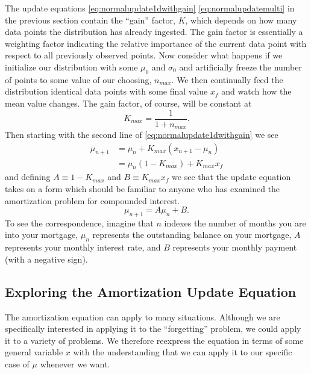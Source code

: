 \documentclass[../../main.tex]{subfiles}
\begin{document}
The update equations \eqref{eq:normalupdate1dwithgain}
\eqref{eq:normalupdatemulti} in the previous section contain the ``gain''
factor, $K$, which depends on how many data points the distribution has already
ingested.  The gain factor is essentially a weighting factor indicating the
relative importance of the current data point with respect to all previously
observed points.  Now consider what happens if we initialize our distribution
with some $\mu_0$ and $\sigma_0$ and artificially freeze the number of points to
some value of our choosing, $n_{max}$.  We then continually feed the
distribution identical data points with some final value $x_f$ and watch how
the mean value changes.  The gain factor, of course, will be constant at
\begin{equation}
    \label{eq:kconst}
    K_{max} = \frac{1}{1 + n_{max}}.
\end{equation}
Then starting with the second line of
\eqref{eq:normalupdate1dwithgain} we see
\begin{align}
    \label{eq:interest}
    \mu_{n+1} &= \mu_n  + K_{max} \left( x_{n+1} - \mu_n \right)\nonumber\\
              &= \mu_n (1 - K_{max}) + K_{max}x_f
\end{align}
and defining $A \equiv 1-K_{max}$ and $B \equiv K_{max} x_f$
we see that the update equation takes on a form which should be familiar to
anyone who has examined the amortization problem for compounded interest.
\begin{equation}
    \label{eq:interest}
    \mu_{n+1} = A \mu_n + B.
\end{equation}
To see the correspondence, imagine that $n$ indexes the number of months you
are into your mortgage, $\mu_n$ represents the outstanding balance on your
mortgage, $A$ represents your monthly interest rate, and $B$ represents your
monthly payment (with a negative sign). 

\subsection{Exploring the Amortization Update Equation}
The amortization equation can apply to many situations.  Although we are
specifically interested in applying it to the ``forgetting'' problem, we could
apply it to a variety of problems. We therefore reexpress the equation in
terms of some general variable $x$ with the understanding that we can apply it
to our specific case of $\mu$ whenever we want.
\end{document}
